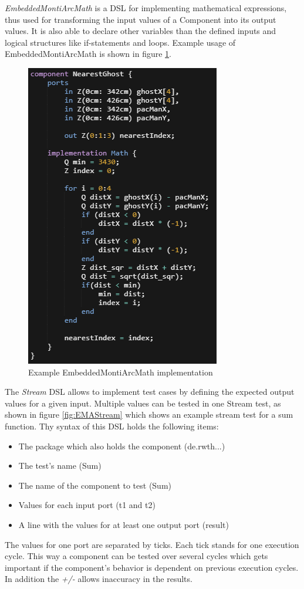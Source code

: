 \emph{EmbeddedMontiArcMath} is a DSL for implementing mathematical expressions, thus used for transforming the input values of a Component into its output values. It is also able to declare other variables than the defined inputs and logical structures like if-statements and loops. Example usage of EmbeddedMontiArcMath is shown in figure \ref{fig:EMontiArcMath}.

\begin{figure}[!h]
	\centering
	\includegraphics[scale=0.7]{pictures/EMAMath.PNG}
	\caption{Example EmbeddedMontiArcMath implementation}
	\label{fig:EMontiArcMath}
\end{figure}

The \emph{Stream} DSL allows to implement test cases by defining the expected output values for a given input. Multiple values can be tested in one Stream test, as shown in figure \ref{fig:EMAStream} which shows an example stream test for a sum function. Thy syntax of this DSL holds the following items: 
\begin{itemize}
	\item The package which also holds the component (de.rwth...)
	\item The test's name (Sum)
	\item The name of the component to test (Sum)
	\item Values for each input port (t1 and t2)
	\item A line with the values for at least one output port (result)
\end{itemize}
The values for one port are separated by ticks. Each tick stands for one execution cycle. This way a component can be tested over several cycles which gets important if the component's behavior is dependent on previous execution cycles. In addition the \textit{+/-} allows inaccuracy in the results.

